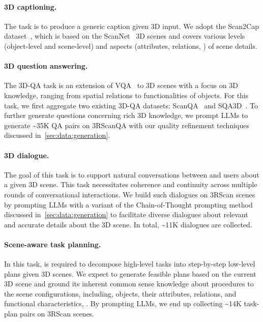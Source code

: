 \paragraph{3D captioning.} The task is to produce a generic caption given 3D input. We adopt the Scan2Cap dataset~\citep{chen2021scan2cap}, which is based on the ScanNet~\citep{dai2017scannet} 3D scenes and covers various levels (object-level and scene-level) and aspects (attributes, relations, \etc) of scene details.

\paragraph{3D question answering.} The 3D-QA task is an extension of VQA~\citep{antol2015vqa} to 3D scenes with a focus on 3D knowledge, ranging from spatial relations to functionalities of objects. For this task, we first aggregate two existing 3D-QA datasets: ScanQA~\citep{azuma2022scanqa} and SQA3D~\citep{ma2023sqa3d}. To further generate questions concerning rich 3D knowledge, we prompt LLMs to generate \textasciitilde{}35K QA pairs on 3RScanQA with our quality refinement techniques discussed in~\cref{sec:data:generation}.



\paragraph{3D dialogue.} The goal of this task is to support natural conversations between \agent and users about a given 3D scene. 
This task necessitates coherence and continuity across multiple rounds of conversational interactions.
We build such dialogues on 3RScan scenes by prompting LLMs with a variant of the Chain-of-Thought prompting method discussed in~\cref{sec:data:generation} to facilitate diverse dialogues about relevant and accurate details about the 3D scene. 
In total, \textasciitilde{}11K dialogues are collected. 



\paragraph{Scene-aware task planning.} In this task, \agent is required to decompose high-level tasks into step-by-step low-level plans given 3D scenes. 
We expect \agent to generate feasible plans based on the current 3D scene and ground its inherent common sense knowledge about procedures to the scene configurations, including, objects, their attributes, relations, and functional characteristics, \etc. By prompting LLMs, we end up collecting \textasciitilde{}14K task-plan pairs on 3RScan scenes.


